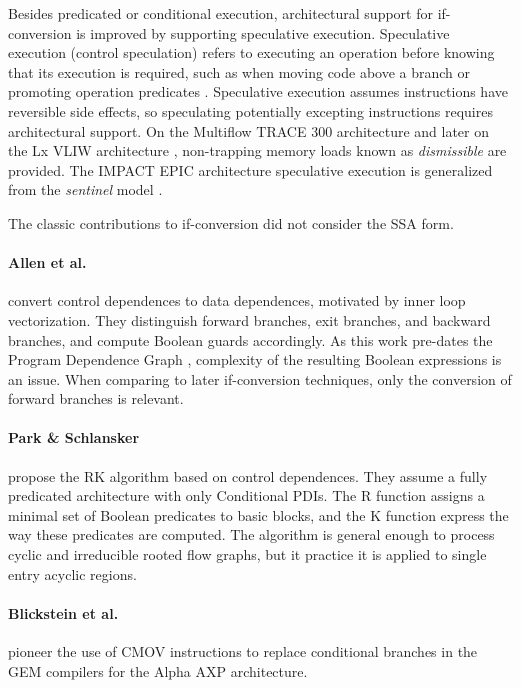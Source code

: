 Besides predicated or conditional execution, architectural support for
if-conversion is improved by supporting speculative execution. Speculative
execution (control speculation) refers to executing an operation before knowing
that its execution is required, such as when moving code above a branch
\cite{Lowney:1993:JS} or promoting operation predicates \cite{Mahlke:1995:ISCA}.
Speculative execution assumes instructions have reversible side effects, so
speculating potentially excepting instructions requires architectural support.
On the Multiflow TRACE 300 architecture and later on the Lx VLIW architecture
\cite{Faraboschi:2000:ISCA}, non-trapping memory loads known as
\emph{dismissible} are provided. The IMPACT EPIC architecture speculative
execution \cite{August:1998:ISCA} is generalized from the \emph{sentinel} model
\cite{Mahlke:1992:ASPLOS}.

\medskip
The classic contributions to if-conversion
did not consider the SSA form.

\paragraph{Allen et al. \cite{Allen:1983:POPL}} convert control dependences to data
dependences, motivated by inner loop vectorization. They distinguish forward
branches, exit branches, and backward branches, and compute Boolean guards
accordingly. As this work pre-dates the Program Dependence Graph
\cite{Ferrante:1987:TOPLAS}, complexity of the resulting Boolean expressions is
an issue. When comparing to later if-conversion techniques, only the conversion
of forward branches is relevant.

\paragraph{Park \& Schlansker \cite{Park:1991:TR58}} propose the RK algorithm based
on control dependences. They assume a fully predicated architecture with only
Conditional PDIs. The R function assigns a minimal set of Boolean predicates to
basic blocks, and the K function express the way these predicates are computed.
The algorithm is general enough to process cyclic and irreducible rooted flow
graphs, but it practice it is applied to single entry acyclic regions.

\paragraph{Blickstein et al. \cite{Blickstein:1992:DTJ}} pioneer the use of CMOV
instructions to replace conditional branches in the GEM compilers for the Alpha
AXP architecture.

